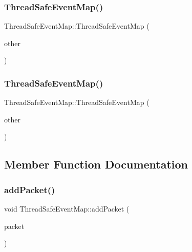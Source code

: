 \subsubsection{\texorpdfstring{Thread\+Safe\+Event\+Map()}{ThreadSafeEventMap()}\hspace{0.1cm}{\footnotesize\ttfamily [2/3]}}
{\footnotesize\ttfamily Thread\+Safe\+Event\+Map\+::\+Thread\+Safe\+Event\+Map (\begin{DoxyParamCaption}\item[{const \hyperlink{class_thread_safe_event_map}{Thread\+Safe\+Event\+Map} \&}]{other }\end{DoxyParamCaption})\hspace{0.3cm}{\ttfamily [delete]}}

\mbox{\label{class_thread_safe_event_map_af28959f5fbd84f00d227d10e1b37e5e5}} 
\subsubsection{\texorpdfstring{Thread\+Safe\+Event\+Map()}{ThreadSafeEventMap()}\hspace{0.1cm}{\footnotesize\ttfamily [3/3]}}
{\footnotesize\ttfamily Thread\+Safe\+Event\+Map\+::\+Thread\+Safe\+Event\+Map (\begin{DoxyParamCaption}\item[{const \hyperlink{class_thread_safe_event_map}{Thread\+Safe\+Event\+Map} \&\&}]{other }\end{DoxyParamCaption})\hspace{0.3cm}{\ttfamily [delete]}}



\subsection{Member Function Documentation}
\mbox{\label{class_thread_safe_event_map_aafd485696f0a50da8afa864f04f0aa07}} 
\subsubsection{\texorpdfstring{add\+Packet()}{addPacket()}}
{\footnotesize\ttfamily void Thread\+Safe\+Event\+Map\+::add\+Packet (\begin{DoxyParamCaption}\item[{std\+::unique\+\_\+ptr$<$ \hyperlink{class_packet}{Packet} $>$}]{packet }\end{DoxyParamCaption})}



